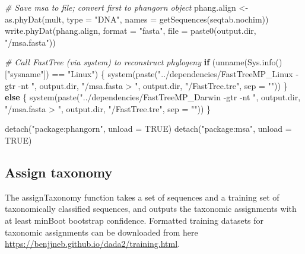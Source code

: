 \documentclass[
]{article}
\newenvironment{Shaded}{\begin{snugshade}}{\end{snugshade}}
\newcommand{\AttributeTok}[1]{\textcolor[rgb]{0.77,0.63,0.00}{#1}}
\newcommand{\CommentTok}[1]{\textcolor[rgb]{0.56,0.35,0.01}{\textit{#1}}}
\newcommand{\ConstantTok}[1]{\textcolor[rgb]{0.00,0.00,0.00}{#1}}
\newcommand{\ControlFlowTok}[1]{\textcolor[rgb]{0.13,0.29,0.53}{\textbf{#1}}}
\newcommand{\FunctionTok}[1]{\textcolor[rgb]{0.00,0.00,0.00}{#1}}
\newcommand{\NormalTok}[1]{#1}
\newcommand{\OtherTok}[1]{\textcolor[rgb]{0.56,0.35,0.01}{#1}}
\newcommand{\SpecialCharTok}[1]{\textcolor[rgb]{0.00,0.00,0.00}{#1}}
\newcommand{\StringTok}[1]{\textcolor[rgb]{0.31,0.60,0.02}{#1}}
\begin{document}
\begin{Shaded}
\begin{Highlighting}[]
\CommentTok{\# Save msa to file; convert first to phangorn object}
\NormalTok{phang.align }\OtherTok{\textless{}{-}} \FunctionTok{as.phyDat}\NormalTok{(mult, }\AttributeTok{type =} \StringTok{"DNA"}\NormalTok{, }\AttributeTok{names =} \FunctionTok{getSequences}\NormalTok{(seqtab.nochim))}
\FunctionTok{write.phyDat}\NormalTok{(phang.align, }\AttributeTok{format =} \StringTok{"fasta"}\NormalTok{, }\AttributeTok{file =} \FunctionTok{paste0}\NormalTok{(output.dir, }
    \StringTok{"/msa.fasta"}\NormalTok{))}

\CommentTok{\# Call FastTree (via \textquotesingle{}system\textquotesingle{}) to reconstruct phylogeny}
\ControlFlowTok{if}\NormalTok{ (}\FunctionTok{unname}\NormalTok{(}\FunctionTok{Sys.info}\NormalTok{()[}\StringTok{"sysname"}\NormalTok{]) }\SpecialCharTok{==} \StringTok{"Linux"}\NormalTok{) \{}
    \FunctionTok{system}\NormalTok{(}\FunctionTok{paste}\NormalTok{(}\StringTok{"../dependencies/FastTreeMP\_Linux {-}gtr {-}nt "}\NormalTok{, }
\NormalTok{        output.dir, }\StringTok{"/msa.fasta \textgreater{} "}\NormalTok{, output.dir, }\StringTok{"/FastTree.tre"}\NormalTok{, }
        \AttributeTok{sep =} \StringTok{""}\NormalTok{))}
\NormalTok{\} }\ControlFlowTok{else}\NormalTok{ \{}
    \FunctionTok{system}\NormalTok{(}\FunctionTok{paste}\NormalTok{(}\StringTok{"../dependencies/FastTreeMP\_Darwin {-}gtr {-}nt "}\NormalTok{, }
\NormalTok{        output.dir, }\StringTok{"/msa.fasta \textgreater{} "}\NormalTok{, output.dir, }\StringTok{"/FastTree.tre"}\NormalTok{, }
        \AttributeTok{sep =} \StringTok{""}\NormalTok{))}
\NormalTok{\}}

\FunctionTok{detach}\NormalTok{(}\StringTok{"package:phangorn"}\NormalTok{, }\AttributeTok{unload =} \ConstantTok{TRUE}\NormalTok{)}
\FunctionTok{detach}\NormalTok{(}\StringTok{"package:msa"}\NormalTok{, }\AttributeTok{unload =} \ConstantTok{TRUE}\NormalTok{)}
\end{Highlighting}
\end{Shaded}

\hypertarget{assign-taxonomy}{%
\subsection{Assign taxonomy}\label{assign-taxonomy}}

The assignTaxonomy function takes a set of sequences and a training set
of taxonomically classified sequences, and outputs the taxonomic
assignments with at least minBoot bootstrap confidence. Formatted
training datasets for taxonomic assignments can be downloaded from here
\url{https://benjjneb.github.io/dada2/training.html}.
\end{document}
